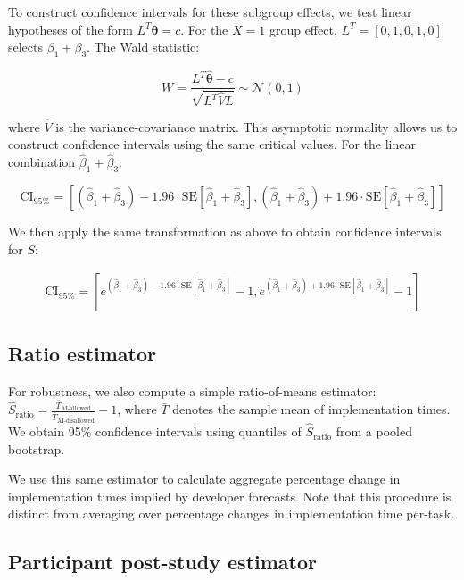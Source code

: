 \documentclass{article}
\begin{document}
To construct confidence intervals for these subgroup effects, we test linear hypotheses of the form $L^T\boldsymbol{\theta} = c$. For the $X=1$ group effect, $L^T = [0, 1, 0, 1, 0]$ selects $\beta_1 + \beta_3$. The Wald statistic:

\begin{equation}
W = \frac{L^T\hat{\boldsymbol{\theta}} - c}{\sqrt{L^T\hat{V}L}} \sim \mathcal{N}(0,1)
\end{equation}

where $\hat{V}$ is the variance-covariance matrix. This asymptotic normality allows us to construct confidence intervals using the same critical values. For the linear combination $\hat\beta_1 + \hat\beta_3$:

\begin{equation}
\text{CI}_{95\%} = \left[(\hat\beta_1 + \hat\beta_3) - 1.96 \cdot \text{SE}[\hat\beta_1 + \hat\beta_3], (\hat\beta_1 + \hat\beta_3) + 1.96 \cdot \text{SE}[\hat\beta_1 + \hat\beta_3]\right]
\end{equation}

We then apply the same transformation as above to obtain confidence intervals for $S$:

\begin{align}
\text{CI}_{95\%} = \left[e^{(\hat\beta_1 + \hat\beta_3) - 1.96 \cdot \text{SE}[\hat\beta_1 + \hat\beta_3]} - 1, e^{(\hat\beta_1 + \hat\beta_3) + 1.96 \cdot \text{SE}[\hat\beta_1 + \hat\beta_3]} - 1\right]
\end{align}

\subsection{Ratio estimator}
\label{sec:ratio-estimator}

For robustness, we also compute a simple ratio-of-means estimator: $\hat{S}_{\text{ratio}} = \frac{\bar{T}_{\text{AI-allowed}}}{\bar{T}_{\text{AI-disallowed}}} - 1$, where $\bar{T}$ denotes the sample mean of implementation times. We obtain 95\% confidence intervals using quantiles of $\hat{S}_{\text{ratio}}$ from a pooled bootstrap.

We use this same estimator to calculate aggregate percentage change in implementation times implied by developer forecasts. Note that this procedure is distinct from averaging over percentage changes in implementation time per-task.

\subsection{Participant post-study estimator}
\label{sec:retrodiction-estimator}
\end{document}
